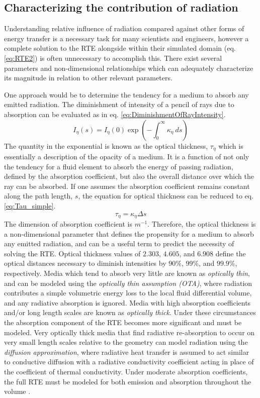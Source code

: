 \subsection{Characterizing the contribution of radiation}
Understanding relative influence of radiation compared against other forms of energy transfer is a necessary task for many scientists and engineers, however a complete solution to the RTE alongside within their simulated domain (eq. \ref{eq:RTE2}) is often unnecessary to accomplish this. 
There exist several parameters and non-dimensional relationships which can adequately characterize its magnitude in relation to other relevant parameters.

One approach would be to determine the tendency for a medium to absorb any emitted radiation. The diminishment of intensity of a pencil of rays due to absorption can be evaluated as in eq. \ref{eq:DiminishmentOfRayIntensity}.
\begin{equation}
    I_\eta{}(s)=I_\eta{}(0)\exp{\left(-\int^\infty_0{\kappa{}_\eta{}~ds}\right)}
    \label{eq:DiminishmentOfRayIntensity}
\end{equation}
The quantity in the exponential is known as the optical thickness, $\tau{}_\eta{}$ which is essentially a description of the opacity of a medium. It is a function of not only the tendency for a fluid element to absorb the energy of passing radiation, defined by the absorption coefficient, but also the overall distance over which the ray can be absorbed.
If one assumes the absorption coefficient remains constant along the path length, $s$, the equation for optical thickness can be reduced to eq. \ref{eq:Tau_simple}.
\begin{equation}
    \tau{}_\eta = \kappa{}_\eta{}\Delta{s}
    \label{eq:Tau_simple}
\end{equation}
The dimension of absorption coefficient is $m^{-1}$. Therefore, the optical thickness is a non-dimensional parameter that defines the propensity for a medium to absorb any emitted radiation, and can be a useful term to predict the necessity of solving the RTE. 
Optical thickness values of $2.303$, $4.605$, and $6.908$ define the optical distances necessary to diminish intensities by $90$\%, $99$\%, and $99.9$\%, respectively.
Media which tend to absorb very little are known as \textit{optically thin}, and can be modeled using the \textit{optically thin assumption (OTA)}, where radiation contributes a simple volumetric energy loss to the local fluid differential volume, and any radiative absorption is ignored.
Media with high absorption coefficients and/or long length scales are known as \textit{optically thick}. Under these circumstances the absorption component of the RTE becomes more significant and must be modeled.
Very optically thick media that find radiative re-absorption to occur on very small length scales relative to the geometry can model radiation using the \textit{diffusion approximation}, where radiative heat transfer is assumed to act similar to conductive diffusion with a radiative conductivity coefficient acting in place of the coefficient of thermal conductivity. 
Under moderate absorption coefficients, the full RTE must be modeled for both emission and absorption throughout the volume \cite{Modest2013RadiativeTransfer}.


